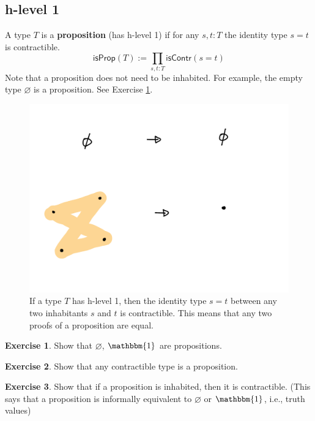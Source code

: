 \documentclass{amsart}
\theoremstyle{definition}
\newtheorem{ex}{Exercise}[section]
\newcommand{\isProp}{\ensuremath{\mathsf{isProp}}}
\newcommand{\isContr}{\ensuremath{\mathsf{isContr}}}
\renewcommand{\emph}{\textbf}
\renewcommand{\emptyset}{\varnothing}
\begin{document}
\subsection{h-level 1}\label{sec:h-level-1}
A type $T$ is a \emph{proposition} (has h-level 1) if for any $s, t : T$ the identity type $s = t$ is contractible.
\[
    \isProp(T) := \prod_{s,t : T}\isContr(s = t)
\]
Note that a proposition does not need to be inhabited.
For example, the empty type $\varnothing$ is a proposition.
See Exercise \ref{ex:empty-unit-prop}.
\begin{figure}[h]
    \centering
    \includegraphics[scale=0.5]{hlvl1.png}
    \caption{If a type $T$ has h-level 1, then the identity type $s = t$ between any two inhabitants $s$ and $t$ is contractible.
    This means that any two proofs of a proposition are equal.}
    \label{fig:h-level-1}
\end{figure}

\begin{ex}\label{ex:empty-unit-prop}
Show that $\emptyset$, $\mathbbm{1}$ are propositions.
\end{ex}

\begin{ex}
Show that any contractible type is a proposition.
\end{ex}

\begin{ex}
Show that if a proposition is inhabited, then it is contractible. (This says that a proposition is informally equivalent to $\varnothing$ or $\mathbbm{1}$, i.e., truth values) %
\end{ex}
\end{document}
